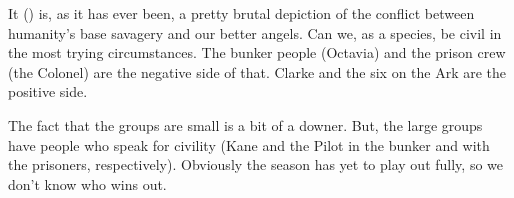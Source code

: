 \documentclass[../butidigress.tex]{subfiles}
\begin{document}
\begin{somenotes}{}
    \item It () is, as it has ever been, a pretty brutal depiction of the conflict between humanity's base savagery and our better angels. Can we, as a species, be civil in the most trying circumstances. The bunker people (Octavia) and the prison crew (the Colonel) are the negative side of that. Clarke and the six on the Ark are the positive side.\par The fact that the  groups are small is a bit of a downer. But, the large groups have people who speak for civility (Kane and the Pilot in the bunker and with the prisoners, respectively). Obviously the season has yet to play out fully, so we don't know who wins out.
\end{somenotes}

\end{document}
